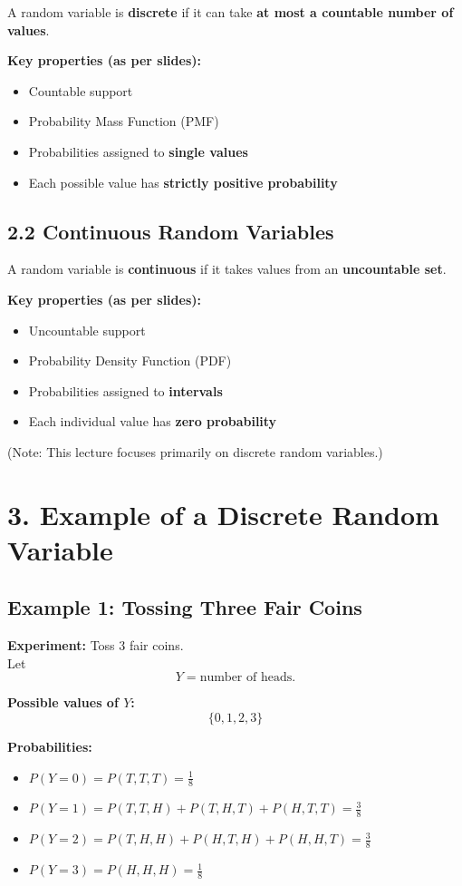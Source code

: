\documentclass[12pt]{article}
\begin{document}
A random variable is \textbf{discrete} if it can take \textbf{at most a countable number of values}.

\textbf{Key properties (as per slides):}
\begin{itemize}
\item Countable support
\item Probability Mass Function (PMF)
\item Probabilities assigned to \textbf{single values}
\item Each possible value has \textbf{strictly positive probability}
\end{itemize}

\subsection*{2.2 Continuous Random Variables}

A random variable is \textbf{continuous} if it takes values from an \textbf{uncountable set}.

\textbf{Key properties (as per slides):}
\begin{itemize}
\item Uncountable support
\item Probability Density Function (PDF)
\item Probabilities assigned to \textbf{intervals}
\item Each individual value has \textbf{zero probability}
\end{itemize}

(Note: This lecture focuses primarily on discrete random variables.)

\section*{3. Example of a Discrete Random Variable}

\subsection*{Example 1: Tossing Three Fair Coins}

\textbf{Experiment:} Toss 3 fair coins. \\
Let
\[
Y = \text{number of heads}.
\]

\textbf{Possible values of $Y$:}
\[
\{0, 1, 2, 3\}
\]

\textbf{Probabilities:}
\begin{itemize}
\item $P(Y = 0) = P(T,T,T) = \frac{1}{8}$
\item $P(Y = 1) = P(T,T,H) + P(T,H,T) + P(H,T,T) = \frac{3}{8}$
\item $P(Y = 2) = P(T,H,H) + P(H,T,H) + P(H,H,T) = \frac{3}{8}$
\item $P(Y = 3) = P(H,H,H) = \frac{1}{8}$
\end{itemize}
\end{document}
